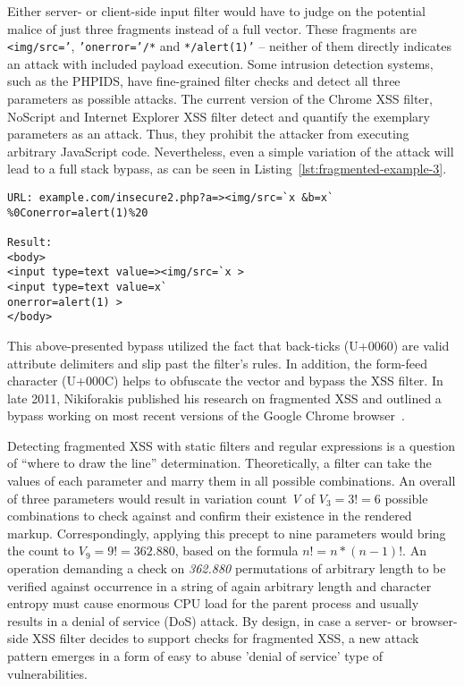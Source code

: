       Either server- or client-side input filter would have to judge on the potential malice of just three fragments instead of a full vector. These fragments are \texttt{<img/src='}, \texttt{'onerror='/*} and \texttt{*/alert(1)'} -- neither of them directly indicates an attack with included payload execution. Some intrusion detection systems, such as the PHPIDS, have fine-grained filter checks and detect all three parameters as possible attacks. The current version of the Chrome XSS filter, NoScript and Internet Explorer XSS filter detect and quantify the exemplary parameters as an attack. Thus, they prohibit the attacker from executing arbitrary JavaScript code. Nevertheless, even a simple variation of the attack will lead to a full stack bypass, as can be seen in Listing~\ref{lst:fragmented-example-3}.\\

\begin{lstlisting}[label=lst:fragmented-example-3,caption=Bypassing the Internet Explorer 9 XSS filter,captionpos=b]
URL: example.com/insecure2.php?a=><img/src=`x &b=x` %0Conerror=alert(1)%20

Result:
<body>
<input type=text value=><img/src=`x >
<input type=text value=x` 
onerror=alert(1) >
</body>
\end{lstlisting}

      This above-presented bypass utilized the fact that back-ticks (U+0060) are valid attribute delimiters and slip past the filter's rules. In addition, the form-feed character (U+000C) helps to obfuscate the vector and bypass the XSS filter. In late 2011, Nikiforakis published his research on fragmented XSS and outlined a bypass working on most recent versions of the Google Chrome browser~\cite{nikiforakis_bypassing_2011}. 

      Detecting fragmented XSS with static filters and regular expressions is a question of ``where to draw the line'' determination. Theoretically, a filter can take the values of each parameter and marry them in all possible combinations. An overall of three parameters would result in variation count \textit{V} of $V_3 = 3! = 6$ possible combinations to check against and confirm their existence in the rendered markup. Correspondingly, applying this precept to nine parameters would bring the count to $V_9 = 9! = 362.880$, based on the formula $n! = n*(n-1)!$. An operation demanding a check on \textit{362.880} permutations of arbitrary length to be verified against occurrence in a string of again arbitrary length and character entropy must cause enormous CPU load for the parent process and usually results in a denial of service (DoS) attack. By design, in case a server- or browser-side XSS filter decides to support checks for fragmented XSS, a new attack pattern emerges in a form of easy to abuse 'denial of 
service' type of vulnerabilities. \\

